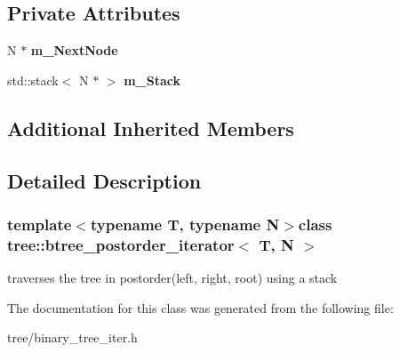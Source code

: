 \subsection*{Private Attributes}
\begin{DoxyCompactItemize}
\item 
\hypertarget{classtree_1_1btree__postorder__iterator_afdbf2d545eae73723f0d93caa427cb85}{N $\ast$ {\bfseries m\-\_\-\-Next\-Node}}\label{classtree_1_1btree__postorder__iterator_afdbf2d545eae73723f0d93caa427cb85}

\item 
\hypertarget{classtree_1_1btree__postorder__iterator_a696bd97e9f2496b7a0ea95867fe87dc2}{std\-::stack$<$ N $\ast$ $>$ {\bfseries m\-\_\-\-Stack}}\label{classtree_1_1btree__postorder__iterator_a696bd97e9f2496b7a0ea95867fe87dc2}

\end{DoxyCompactItemize}
\subsection*{Additional Inherited Members}


\subsection{Detailed Description}
\subsubsection*{template$<$typename T, typename N$>$class tree\-::btree\-\_\-postorder\-\_\-iterator$<$ T, N $>$}

traverses the tree in postorder(left, right, root) using a stack 

The documentation for this class was generated from the following file\-:\begin{DoxyCompactItemize}
\item 
tree/binary\-\_\-tree\-\_\-iter.\-h\end{DoxyCompactItemize}
